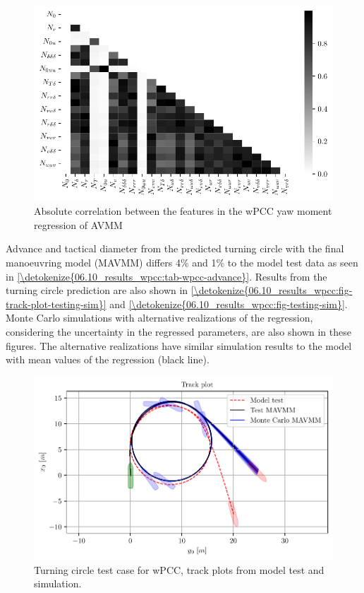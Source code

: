 \begin{figure}[!htb]
\centering
\includegraphics[width=\textwidth]{kappa/images/9.pdf}
\caption{Absolute correlation between the features in the wPCC yaw moment regression of AVMM}\label{\detokenize{06.10_results_wpcc:fig-ncorr}}\end{figure}
Advance and tactical diameter \cite{imo_standards_2002} from the predicted turning circle with the final manoeuvring model (MAVMM) differs 4\% and 1\% to the model test data as seen in \autoref{\detokenize{06.10_results_wpcc:tab-wpcc-advance}}. Results from the turning circle prediction are also shown in  \autoref{\detokenize{06.10_results_wpcc:fig-track-plot-testing-sim}} and  \autoref{\detokenize{06.10_results_wpcc:fig-testing-sim}}. Monte Carlo simulations with alternative realizations of the regression, considering the uncertainty in the regressed parameters, are also shown in these figures. The alternative realizations have similar simulation results to the model with mean values of the regression (black line).

\begin{figure}[!htb]
\centering
\includegraphics[width=\textwidth]{kappa/images/10.pdf}
\caption{Turning circle test case for wPCC, track plots from model test and simulation.}\label{\detokenize{06.10_results_wpcc:fig-track-plot-testing-sim}}\end{figure}

